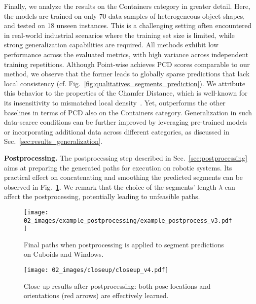 Finally, we analyze the results on the Containers category in greater detail. Here, the models are trained on only 70 data samples of heterogeneous object shapes, and tested on 18 unseen instances.
%
This is a challenging setting often encountered in real-world industrial scenarios where the training set size is limited, while strong generalization capabilities are required.
%
All methods exhibit low performance across the evaluated metrics, with high variance across independent training repetitions.
Although Point-wise achieves PCD scores comparable to our method, we observe that the former leads to globally sparse predictions that lack local consistency (cf. Fig.~\ref{fig:qualitatives_segments_prediction}).
We attribute this behavior to the properties of the Chamfer Distance, which is well-known for its insensitivity to mismatched local density~\cite{densityawarecd}.
%
Yet, \ours outperforms the other baselines in terms of PCD also on the Containers category.
%
Generalization in such data-scarce conditions can be further improved by leveraging pre-trained models or incorporating additional data across different categories, as discussed in Sec.~\ref{sec:results_generalization}.

\noindent \textbf{Postprocessing.}
The postprocessing step described in Sec.~\ref{sec:postprocessing} aims at preparing the generated paths for execution on robotic systems.
Its practical effect on concatenating and smoothing the predicted segments can be observed in Fig.~\ref{fig:example_postprocess}.
We remark that the choice of the segments' length $\lambda$ can affect the postprocessing, potentially leading to unfeasible paths.
%

\begin{figure}[] %
    \centering
    \texttt{[image: 02\_images/example\_postprocessing/example\_postprocess\_v3.pdf]}
    \vspace{-28pt}
    \caption{Final paths when postprocessing is applied to segment predictions on Cuboids and Windows.}
    \vspace{-6pt}
    \label{fig:example_postprocess}
\end{figure}

\begin{figure}[]
    \centering
    \texttt{[image: 02\_images/closeup/closeup\_v4.pdf]}
    \caption{
    Close up \ours results after postprocessing: both pose locations and orientations (red arrows) are effectively learned.
    }
    \label{fig:closeup}
    \vspace{-6pt}
\end{figure}

